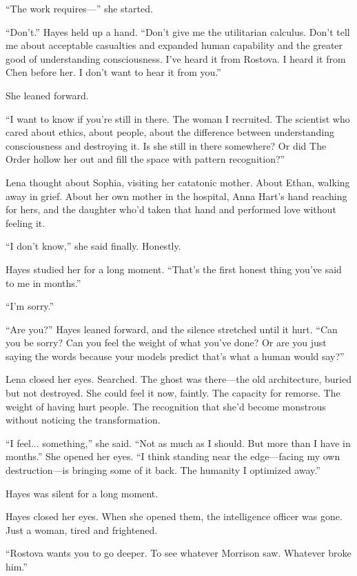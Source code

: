 ``The work requires—'' she started.

``Don't.'' Hayes held up a hand. ``Don't give me the utilitarian calculus. Don't tell me about acceptable casualties and expanded human capability and the greater good of understanding consciousness. I've heard it from Rostova. I heard it from Chen before her. I don't want to hear it from you.''

She leaned forward.

``I want to know if you're still in there. The woman I recruited. The scientist who cared about ethics, about people, about the difference between understanding consciousness and destroying it. Is she still in there somewhere? Or did The Order hollow her out and fill the space with pattern recognition?''

Lena thought about Sophia, visiting her catatonic mother. About Ethan, walking away in grief. About her own mother in the hospital, Anna Hart's hand reaching for hers, and the daughter who'd taken that hand and performed love without feeling it.

``I don't know,'' she said finally. Honestly.

Hayes studied her for a long moment. ``That's the first honest thing you've said to me in months.''

``I'm sorry.''

``Are you?'' Hayes leaned forward, and the silence stretched until it hurt. ``Can you be sorry? Can you feel the weight of what you've done? Or are you just saying the words because your models predict that's what a human would say?''

Lena closed her eyes. Searched. The ghost was there—the old architecture, buried but not destroyed. She could feel it now, faintly. The capacity for remorse. The weight of having hurt people. The recognition that she'd become monstrous without noticing the transformation.

``I feel... something,'' she said. ``Not as much as I should. But more than I have in months.'' She opened her eyes. ``I think standing near the edge—facing my own destruction—is bringing some of it back. The humanity I optimized away.''

Hayes was silent for a long moment.

Hayes closed her eyes. When she opened them, the intelligence officer was gone. Just a woman, tired and frightened.

``Rostova wants you to go deeper. To see whatever Morrison saw. Whatever broke him.''

